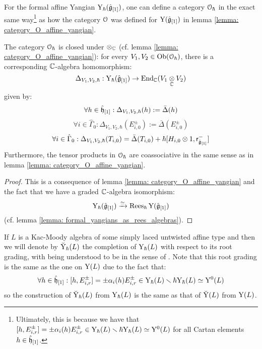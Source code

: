         \begin{lemma} \label{lemma: category_O_formal_affine_yangian}
            For the formal affine Yangian $\mathrm{Y}_{\hbar}(\hat{\mathfrak{g}}_{[1]})$, one can define a category $\mathcal{O}_{\hbar}$ in the exact same way\footnote{Ultimately, this is because we have that $[h, E_{i, r}^{\pm}] = \pm \alpha_i(h) E_{i, r}^{\pm} \in \mathrm{Y}_{\hbar}(L) \smallsetminus \hbar\mathrm{Y}_{\hbar}(L) \simeq \mathrm{Y}^0(L)$ for all Cartan elements $h \in \hat{\mathfrak{h}}_{[1]}$.} as how the category $\mathcal{O}$ was defined for $\mathrm{Y}(\hat{\mathfrak{g}}_{[1]})$ in lemma \ref{lemma: category_O_affine_yangian}. 

            The category $\mathcal{O}_{\hbar}$ is closed under $\tensor_{\bbC}$ (cf. lemma \ref{lemma: category_O_affine_yangian}): for every $V_1, V_2 \in \mathrm{Ob}(\mathcal{O}_{\hbar})$, there is a corresponding $\mathbb{C}$-algebra homomorphism:
                $$\Delta_{V_1, V_2, \hbar}: \rmY_{\hbar}(\hat{\g}_{[1]}) \to \End_{\bbC}(V_1 \tensor_{\bbC} V_2)$$
            given by:
                $$\forall h \in \hat{\mathfrak{h}}_{[1]}: \Delta_{V_1, V_2, \hbar}(h) := \bar{\Delta}(h)$$
                $$\forall i \in \hat{\Gamma}_0: \Delta_{V_1, V_2, \hbar}(E_{i, 0}^{\pm}) := \bar{\Delta}(E_{i, 0}^{\pm})$$
                $$\forall i \in \hat{\Gamma}_0: \Delta_{V_1, V_2, \hbar}(T_{i, 0}) = \bar{\Delta}(T_{i, 0}) + \hbar [H_{i, 0} \tensor 1, \sfr_{ \hat{\g}_{[1]} }^- ]$$
            Furthermore, the tensor products in $\mathcal{O}_{\hbar}$ are coassociative in the same sense as in lemma \ref{lemma: category_O_affine_yangian}.
        \end{lemma}
            \begin{proof}
                This is a consequence of lemma \ref{lemma: category_O_affine_yangian} and the fact that we have a graded $\mathbb{C}$-algebra isomorphism:
                    $$\mathrm{Y}_{\hbar}(\hat{\mathfrak{g}}_{[1]}) \xrightarrow[]{\simeq} \operatorname{Rees}_{\hbar} \mathrm{Y}(\hat{\mathfrak{g}}_{[1]})$$
                (cf. lemma \ref{lemma: formal_yangians_as_rees_algebras}).
            \end{proof}
        \begin{convention}
            If $L$ is a Kac-Moody algebra of some simply laced untwisted affine type and then we will denote by $\breve{\mathrm{Y}}_{\hbar}(L)$ the completion of $\mathrm{Y}_{\hbar}(L)$ with respect to its root grading, with  being understood to be in the sense of \cite[Appendix A]{wendlandt_formal_shift_operators_on_yangian_doubles}. Note that this root grading is the same as the one on $\mathrm{Y}(L)$ due to the fact that:
                $$\forall h \in \hat{\mathfrak{h}}_{[1]}: [h, E_{i, r}^{\pm}] = \pm \alpha_i(h) E_{i, r}^{\pm} \in \mathrm{Y}_{\hbar}(L) \smallsetminus \hbar\mathrm{Y}_{\hbar}(L) \simeq \mathrm{Y}^0(L)$$
            so the construction of $\breve{\mathrm{Y}}_{\hbar}(L)$ from $\mathrm{Y}_{\hbar}(L)$ is the same as that of $\breve{\mathrm{Y}}(L)$ from $\mathrm{Y}(L)$.
        \end{convention}
